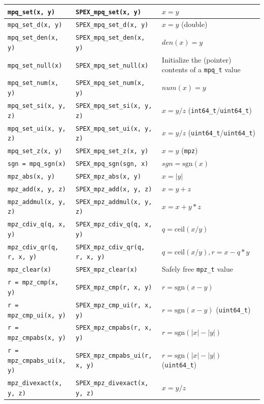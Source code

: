 \documentclass[12pt,oneside]{book}
\theoremstyle{definition}
\newenvironment{SizedCenteredTabular}[2][\small]
    {   
        #1\begin{center}\begin{tabular}{#2}
    }{ 
        \end{tabular}\end{center}
    }
\begin{document}
\begin{SizedCenteredTabular}[\scriptsize]{|l|l|p{2in}|}
\verb|mpq_set(x, y)|& \verb|SPEX_mpq_set(x, y)|& $x = y$ \\ \hline
\verb|mpq_set_d(x, y)|& \verb|SPEX_mpq_set_d(x, y)|& $x=y$ (double) \\ \hline
\verb|mpq_set_den(x, y)|& \verb|SPEX_mpq_set_den(x, y)|& $den(x) = y$ \\ \hline
\verb|mpq_set_null(x)| & \verb|SPEX_mpq_set_null(x)| & Initialize the (pointer) contents of a \verb|mpq_t| value \\ \hline
\verb|mpq_set_num(x, y)|& \verb|SPEX_mpq_set_num(x, y)|& $num(x) = y$ \\ \hline
\verb|mpq_set_si(x, y, z)|& \verb|SPEX_mpq_set_si(x, y, z)|& $x = y/z$ (\verb|int64_t|/\verb|uint64_t|) \\ \hline
\verb|mpq_set_ui(x, y, z)|& \verb|SPEX_mpq_set_ui(x, y, z)|& $x = y/z$ (\verb|uint64_t|/\verb|uint64_t|) \\ \hline
\verb|mpq_set_z(x, y)|& \verb|SPEX_mpq_set_z(x, y)|& $x = y$ (\verb|mpz|) \\ \hline
\verb|sgn = mpq_sgn(x)|& \verb|SPEX_mpq_sgn(sgn, x)|& $sgn = \text{sgn}(x)$ \\ \hline
\hline
\verb|mpz_abs(x, y)|& \verb|SPEX_mpz_abs(x, y)|& $x = |y|$ \\ \hline
\verb|mpz_add(x, y, z)|& \verb|SPEX_mpz_add(x, y, z)|& $x = y+z$ \\ \hline
\verb|mpz_addmul(x, y, z)|& \verb|SPEX_mpz_addmul(x, y, z)|& $x = x+y*z$ \\ \hline
\verb|mpz_cdiv_q(q, x, y)|& \verb|SPEX_mpz_cdiv_q(q, x, y)|& $q = \text{ceil}(x/y)$ \\ \hline
\verb|mpz_cdiv_qr(q, r, x, y)|& \verb|SPEX_mpz_cdiv_qr(q, r, x, y)|& $q = \text{ceil}(x/y), r = x-q*y$ \\ \hline
\verb|mpz_clear(x)|& \verb|SPEX_mpz_clear(x)|& Safely free \verb|mpz_t| value \\ \hline
\verb|r = mpz_cmp(x, y)|& \verb|SPEX_mpz_cmp(r, x, y)|& $r = \text{sgn}(x-y)$ \\ \hline
\verb|r = mpz_cmp_ui(x, y)|& \verb|SPEX_mpz_cmp_ui(r, x, y)|& $r = \text{sgn}(x-y)$ (\verb|uint64_t|) \\ \hline
\verb|r = mpz_cmpabs(x, y)|& \verb|SPEX_mpz_cmpabs(r, x, y)|& $r = \text{sgn}(|x|-|y|)$\\ \hline
\verb|r = mpz_cmpabs_ui(x, y)|& \verb|SPEX_mpz_cmpabs_ui(r, x, y)|& $r = \text{sgn}(|x|-|y|)$ (\verb|uint64_t|) \\ \hline
\verb|mpz_divexact(x, y, z)|& \verb|SPEX_mpz_divexact(x, y, z)|& $x = y/z$ \\ \hline

\end{SizedCenteredTabular}
\end{document}
